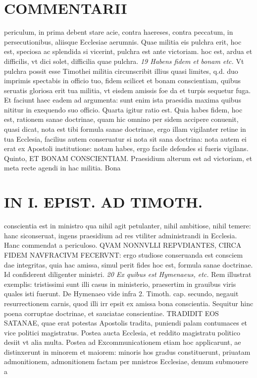 \documentclass{article}
\begin{document}
\begin{pages}
\section*{COMMENTARII }
\marginpar{[ p.40 ]}\pstart periculum, in prima debent stare acie, contra haereses, contra peccatum, in persecutionibus, aliisque Ecclesiae aerumnis. Quae militia eis pulchra erit, hoc est, speciosa ac splendida si vicerint, pulchra est ante victoriam. hoc est, ardua et difficilis, vt dici solet, difficilia quae pulchra.  \pend
\textit{19 Habens fidem et bonam etc. }\pstart Vt pulchra possit esse Timothei militia circunscribit illius quasi limites, q.d. duo imprimis spectabis in officio tuo, fidem scilicet et bonam conscientiam, quibus seruatis gloriosa erit tua militia, vt eisdem amissis foe da et turpis sequetur fuga. Et faciunt haec eadem ad argumenta: sunt enim ista praesidia maxima quibus nititur in exequendo suo officio.  \pend\pstart Quarta igitur ratio est. Quia habes fidem, hoc est, rationem sanae doctrinae, quam hic omnino per sidem accipere conuenit, quasi dicat, nota est tibi formula sanae doctrinae, ergo illam vigilanter retine in tua Ecclesia, facilius autem conseruatur si nota sit sana doctrina: nota autem ei erat ex Apostoli institutione: notam habes, ergo facile defendes si fueris vigilans.  \pend\pstart Quinto, ET BONAM CONSCIENTIAM. Praesidium alterum est ad victoriam, et meta recte agendi in hac militia. Bona  \pend
\section*{IN I. EPIST. AD TIMOTH. }
\marginpar{[ p.41 ]}\pstart conscientia est in ministro qua nihil agit petulanter, nihil ambitiose, nihil temere: hanc siconseruat, ingens praesidium ad res vtiliter administrandi in Ecclesia. Hanc commendat a periculoso. QVAM NONNVLLI REPVDIANTES, CIRCA FIDEM NAVFRACIVM FECERVNT: ergo studiose conseruanda est consciem dae integritas, quia hac amissa, simul perit fides hoc est, formula sanae doctrinae. Id confiderent diligenter ministri.  \pend
\textit{20 Ex quibus est Hymenaeus, etc. }\pstart Rem illustrat exemplis: tristissimi sunt illi casus in ministerio, praesertim in grauibus viris quales isti fuerunt. De Hymenaeo vide infra 2. Timoth. cap. secundo, negauit resurrectionem carnis, quod illi irr epsit ex amissa bona conscientia. Sequitur hinc poena corruptae doctrinae, et sauciatae conscientiae. TRADIDIT EOS SATANAE, quae erat potestas Apostolis tradita, puniendi palam contumaces et vice politici magistratus. Postea aucta Ecclesia, et reddito magistratu politico desiit vt alia multa. Postea ad Excommunicationem etiam hoc applicarunt, ae distinxerunt in minorem et maiorem: minoris hos gradus constituerunt, priuatam admonitionem, admonitionem factam per mnistros Ecclesiae, demum submouere a  \pend

\end{pages}
\end{document}
